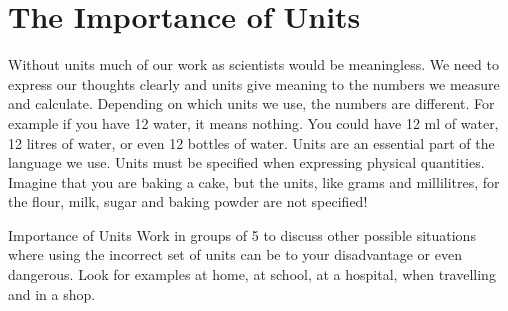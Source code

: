     \section{The Importance of Units}
            \nopagebreak
      \label{m30853*id66787}Without units much of our work as scientists would be meaningless. We need to express our thoughts clearly and units give meaning to the numbers we measure and calculate. Depending on which units we use, the numbers are different. For example if you have 12 water, it means nothing. You could have 12 ml of water, 12 litres of water, or even 12 bottles of water. Units are an essential part of the language we use. Units must be specified when expressing physical quantities. Imagine that you are baking a cake, but the units, like grams and millilitres, for the flour, milk, sugar and baking powder are not specified!\par 
\label{m30853*secfhsst!!!underscore!!!id1038}
\begin{groupdiscussion}{Importance of Units }
            \nopagebreak
      \label{m30853*id62481}Work in groups of 5 to discuss other possible situations where using the incorrect set of units can be to your disadvantage or even dangerous. Look for examples at home, at school, at a hospital, when travelling and in a shop. 
\end{groupdiscussion}
\label{m30853*secfhsst!!!underscore!!!id1041}
